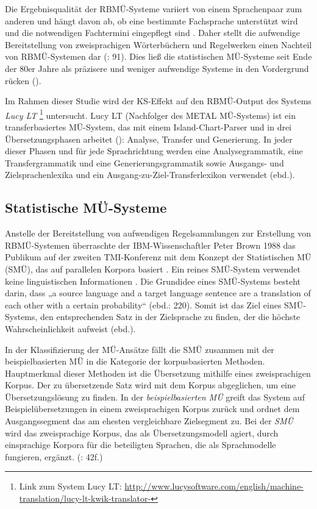 Die Ergebnisqualität der RBMÜ-Systeme variiert von einem Sprachenpaar zum anderen und hängt davon ab, ob eine bestimmte Fachsprache unterstützt wird und die notwendigen Fachtermini eingepflegt sind \citep{Stein2009}. Daher stellt die aufwendige Bereitstellung von zweisprachigen Wörterbüchern und Regelwerken einen Nachteil von RBMÜ-Systemen dar (\citealt{WerthmannWitt2014}: 91). Dies ließ die statistischen MÜ-Systeme seit Ende der 80er Jahre als präzisere und weniger aufwendige Systeme in den Vordergrund rücken (\citealt{TripathiSarkhel2010}).

Im Rahmen dieser Studie wird der KS-Effekt auf den RBMÜ-Output des Systems \textit{Lucy LT} \footnote{\textrm{Link zum System Lucy LT: \url{http://www.lucysoftware.com/english/machine-translation/lucy-lt-kwik-translator-}}} untersucht. Lucy LT (Nachfolger des METAL MÜ-Systems) ist ein transferbasiertes MÜ-System, das mit einem Island-Chart-Parser und in drei Übersetzungsphasen arbeitet (\citealt{MartinSerra2014}): Analyse, Transfer und Generierung. In jeder dieser Phasen und für jede Sprachrichtung werden eine Analysegrammatik, eine Transfergrammatik und eine Generierungsgrammatik sowie Ausgangs- und Zielsprachenlexika und ein Ausgang-zu-Ziel-Transferlexikon verwendet (ebd.).

\subsection{Statistische MÜ-Systeme}
\label{sec:3.2.2}
Anstelle der Bereitstellung von aufwendigen Regelsammlungen zur Erstellung von RBMÜ-Systemen überraschte der IBM-Wissenschaftler Peter Brown 1988 das Publikum auf der zweiten TMI-Konferenz mit dem Konzept der Statistischen MÜ (SMÜ), das auf parallelen Korpora basiert \citep{Stein2009}. Ein reines SMÜ-System verwendet keine linguistischen Informationen \citep{Forcada2010}. Die Grundidee eines SMÜ-Systems besteht darin, dass „a source language and a target language sentence are a translation of each other with a certain probability“ (ebd.: 220). Somit ist das Ziel eines SMÜ-Systems, den entsprechenden Satz in der Zielsprache zu finden, der die höchste Wahrscheinlichkeit aufweist (ebd.).

In der Klassifizierung der MÜ-Ansätze fällt die SMÜ zusammen mit der beispielbasierten MÜ in die Kategorie der korpusbasierten Methoden. Hauptmerkmal dieser Methoden ist die Übersetzung mithilfe eines zweisprachigen Korpus. Der zu übersetzende Satz wird mit dem Korpus abgeglichen, um eine Übersetzungslösung zu finden. In der \textit{beispielbasierten MÜ} greift das System auf Beispielübersetzungen in einem zweisprachigen Korpus zurück und ordnet dem Ausgangssegment das am ehesten vergleichbare Zielsegment zu. Bei der \textit{SMÜ} wird das zweisprachige Korpus, das als Übersetzungsmodell agiert, durch einsprachige Korpora für die beteiligten Sprachen, die als Sprachmodelle fungieren, ergänzt. (\citealt{Ramlow2008}: 42f.)



